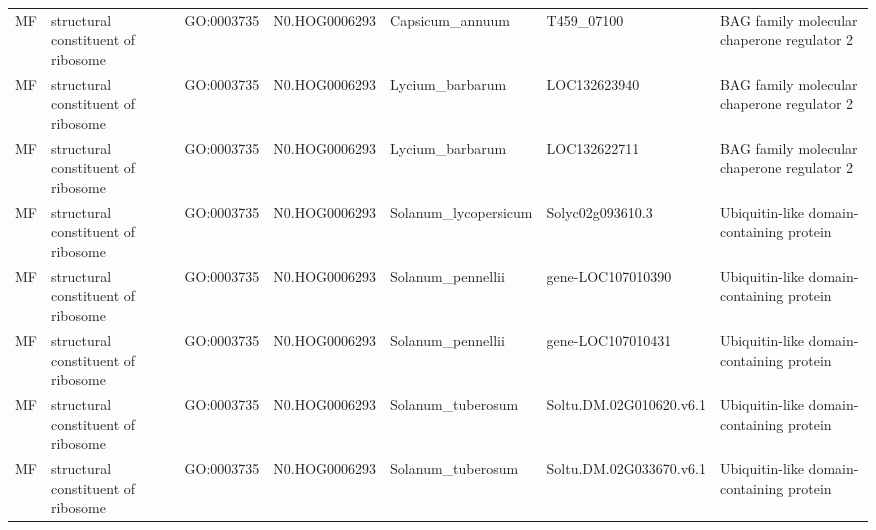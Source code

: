 \begin{table}
\begin{tabular}[t]{lllllll}
MF & structural constituent of ribosome & GO:0003735 & N0.HOG0006293 & Capsicum\_annuum & T459\_07100 & BAG family molecular chaperone regulator 2\\
MF & structural constituent of ribosome & GO:0003735 & N0.HOG0006293 & Lycium\_barbarum & LOC132623940 & BAG family molecular chaperone regulator 2\\
MF & structural constituent of ribosome & GO:0003735 & N0.HOG0006293 & Lycium\_barbarum & LOC132622711 & BAG family molecular chaperone regulator 2\\
MF & structural constituent of ribosome & GO:0003735 & N0.HOG0006293 & Solanum\_lycopersicum & Solyc02g093610.3 & Ubiquitin-like domain-containing protein\\
MF & structural constituent of ribosome & GO:0003735 & N0.HOG0006293 & Solanum\_pennellii & gene-LOC107010390 & Ubiquitin-like domain-containing protein\\
MF & structural constituent of ribosome & GO:0003735 & N0.HOG0006293 & Solanum\_pennellii & gene-LOC107010431 & Ubiquitin-like domain-containing protein\\
MF & structural constituent of ribosome & GO:0003735 & N0.HOG0006293 & Solanum\_tuberosum & Soltu.DM.02G010620.v6.1 & Ubiquitin-like domain-containing protein\\
MF & structural constituent of ribosome & GO:0003735 & N0.HOG0006293 & Solanum\_tuberosum & Soltu.DM.02G033670.v6.1 & Ubiquitin-like domain-containing protein\\
\bottomrule
\end{tabular}
\end{table}
